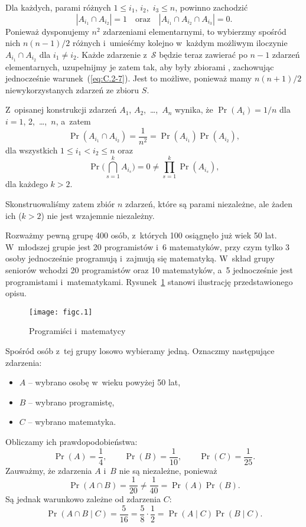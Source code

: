 Dla każdych, parami różnych $1\le i_1$, $i_2$,~$i_3\le n$, powinno zachodzić
\[
	|A_{i_1}\cap A_{i_2}| = 1 \quad\text{oraz}\quad |A_{i_1}\cap A_{i_2}\cap A_{i_3}| = 0. \tag{$*$}\label{eq:C.2-7}
\]
Ponieważ dysponujemy $n^2$ zdarzeniami elementarnymi, to wybierzmy spośród nich $n(n-1)/2$ różnych i~umieśćmy kolejno w~każdym możliwym iloczynie $A_{i_1}\cap A_{i_2}$ dla $i_1\ne i_2$. Każde zdarzenie z~$\mathcal{S}$ będzie teraz zawierać po $n-1$ zdarzeń elementarnych, uzupełnijmy je zatem tak, aby były zbiorami , zachowując jednocześnie warunek~(\ref{eq:C.2-7}). Jest to możliwe, ponieważ mamy $n(n+1)/2$ niewykorzystanych zdarzeń ze zbioru $S$.

Z~opisanej konstrukcji zdarzeń $A_1$, $A_2$,~\dots,~$A_n$ wynika, że $\Pr(A_i)=1/n$ dla $i=1$, 2,~\dots,~$n$, a~zatem
\[
	\Pr(A_{i_1}\cap A_{i_2}) = \frac{1}{n^2} = \Pr(A_{i_1})\Pr(A_{i_2}),
\]
dla wszystkich $1\le i_1<i_2\le n$ oraz
\[
	\Pr\biggl(\bigcap_{s=1}^kA_{i_s}\biggr) = 0 \ne \prod_{s=1}^k\Pr(A_{i_s}),
\]
dla każdego $k>2$.

Skonstruowaliśmy zatem zbiór $n$ zdarzeń, które są parami niezależne, ale żaden ich  ($k>2$) nie jest wzajemnie niezależny.

\exercise{} %
Rozważmy pewną grupę 400 osób, z~których 100 osiągnęło już wiek 50 lat. W~młodszej grupie jest 20 programistów i~6 matematyków, przy czym tylko 3 osoby jednocześnie programują i~zajmują się matematyką. W~skład grupy seniorów wchodzi 20 programistów oraz 10 matematyków, a~5 jednocześnie jest programistami i~matematykami. Rysunek~\ref{fig:C.2-8} stanowi ilustrację przedstawionego opisu.
\begin{figure}[ht]
	\begin{center}
		\texttt{[image: figc.1]}
	\end{center}
	\caption{Programiści i~matematycy} \label{fig:C.2-8}
\end{figure}

Spośród osób z~tej grupy losowo wybieramy jedną. Oznaczmy następujące zdarzenia:
\begin{itemize}
	\item $A$ -- wybrano osobę w~wieku powyżej 50 lat,
	\item $B$ -- wybrano programistę,
	\item $C$ -- wybrano matematyka.
\end{itemize}
Obliczamy ich prawdopodobieństwa:
\[
	\Pr(A) = \frac{1}{4}, \qquad \Pr(B) = \frac{1}{10}, \qquad \Pr(C) = \frac{1}{25}.
\]
Zauważmy, że zdarzenia $A$ i~$B$ nie są niezależne, ponieważ
\[
	\Pr(A\cap B) = \frac{1}{20} \ne \frac{1}{40} = \Pr(A)\Pr(B).
\]
Są jednak warunkowo zależne od zdarzenia $C$:
\[
	\Pr(A\cap B\mid C) = \frac{5}{16} = \frac{5}{8}\cdot\frac{1}{2} = \Pr(A\mid C)\Pr(B\mid C).
\]

